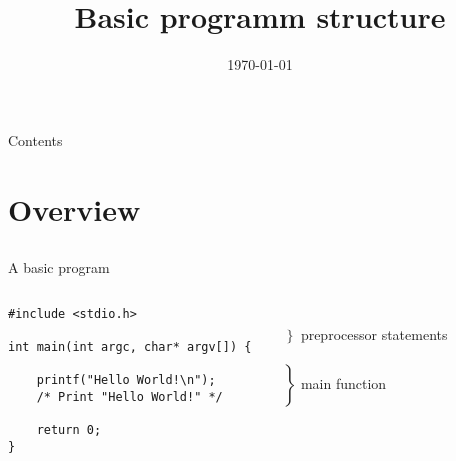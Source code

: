 
\usepackage{ulem}

\newcommand{\topic}{
	Basic programm structure
}

\title{\topic}
\supertitle{\course}
\date{\today}



\maketitle

\begin{frame}{Contents}
	\tableofcontents
\end{frame}

\section{Overview}
\subsection{}
\begin{frame}[fragile]{A basic program}
	\begin{columns}[T]
		\begin{lstlisting}
#include <stdio.h>

int main(int argc, char* argv[]) {

	printf("Hello World!\n");
	/* Print "Hello World!" */

	return 0;
}
\end{lstlisting}
		
		\ \\$\left. \begin{array}{c}\\\end{array}\right\rbrace $ preprocessor statements
		\ \\\ \\$\left. \begin{array}{c}\\\\\\\\\\\end{array}\right\rbrace $ main function
	\end{columns}
\end{frame}
